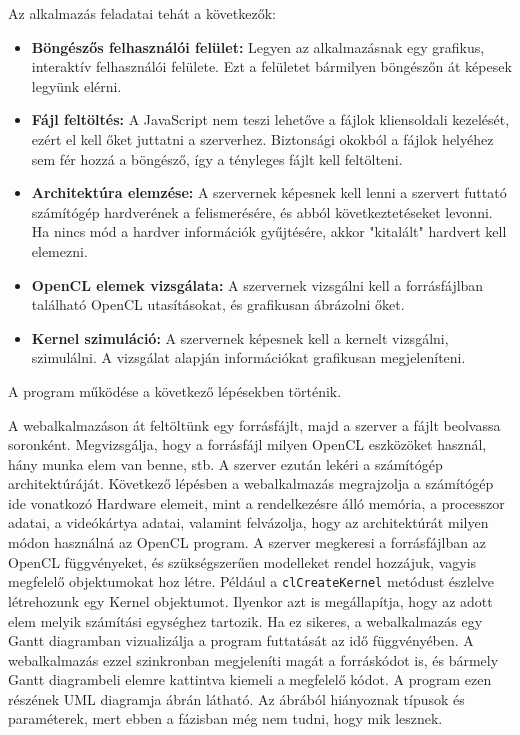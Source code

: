 Az alkalmazás feladatai tehát a következők:
\begin{itemize}
\item\textbf{Böngészős felhasználói felület:} Legyen az alkalmazásnak egy grafikus, interaktív felhasználói felülete. Ezt a felületet bármilyen böngészőn át képesek legyünk elérni.
\item\textbf{Fájl feltöltés:} A JavaScript nem teszi lehetőve a fájlok kliensoldali kezelését, ezért el kell őket juttatni a szerverhez. Biztonsági okokból a fájlok helyéhez sem fér hozzá a böngésző, így a tényleges fájlt kell feltölteni.
\item\textbf{Architektúra elemzése:} A szervernek képesnek kell lenni a szervert futtató számítógép hardverének a felismerésére, és abból következtetéseket levonni. Ha nincs mód a hardver információk gyűjtésére, akkor "kitalált" hardvert kell elemezni.
\item\textbf{OpenCL elemek vizsgálata:} A szervernek vizsgálni kell a forrásfájlban található OpenCL utasításokat, és grafikusan ábrázolni őket.
\item\textbf{Kernel szimuláció:} A szervernek képesnek kell a kernelt vizsgálni, szimulálni. A vizsgálat alapján információkat grafikusan megjeleníteni.
\end{itemize}





A program működése a következő lépésekben történik.

A webalkalmazáson át feltöltünk egy forrásfájlt, majd a szerver a fájlt beolvassa soronként. Megvizsgálja, hogy a forrásfájl milyen OpenCL eszközöket használ, hány munka elem van benne, stb. A szerver ezután lekéri a számítógép architektúráját. Következő lépésben a webalkalmazás megrajzolja a számítógép ide vonatkozó Hardware elemeit, mint a rendelkezésre álló memória, a processzor adatai, a videókártya adatai, valamint felvázolja, hogy az architektúrát milyen módon használná az OpenCL program. A szerver megkeresi a forrásfájlban az OpenCL függvényeket, és szükségszerűen modelleket rendel hozzájuk, vagyis megfelelő objektumokat hoz létre. Például a \texttt{clCreateKernel} metódust észlelve létrehozunk egy Kernel objektumot. Ilyenkor azt is megállapítja, hogy az adott elem melyik számítási egységhez tartozik. Ha ez sikeres, a webalkalmazás egy Gantt diagramban vizualizálja a program futtatását az idő függvényében. A webalkalmazás ezzel szinkronban megjeleníti magát a forráskódot is, és bármely Gantt diagrambeli elemre kattintva kiemeli a megfelelő kódot. A program ezen részének UML diagramja  ábrán látható. Az ábrából hiányoznak típusok és paraméterek, mert ebben a fázisban még nem tudni, hogy mik lesznek.

